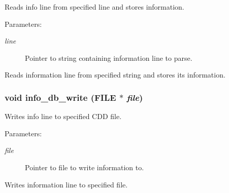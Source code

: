 Reads info line from specified line and stores information. 

\begin{Desc}
\item[Parameters:]
\begin{description}
\item[{\em line}]Pointer to string containing information line to parse.\end{description}
\end{Desc}
Reads information line from specified string and stores its information. 
\subsubsection{\setlength{\rightskip}{0pt plus 5cm}void info\_\-db\_\-write (FILE $\ast$ {\em file})}\label{info_8h_a0}


Writes info line to specified CDD file. 

\begin{Desc}
\item[Parameters:]
\begin{description}
\item[{\em file}]Pointer to file to write information to.\end{description}
\end{Desc}
Writes information line to specified file. 